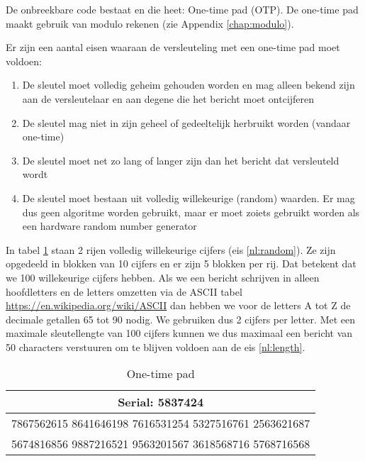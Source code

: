 De onbreekbare code bestaat en die heet: One-time pad (OTP). De one-time pad maakt gebruik van modulo rekenen (zie Appendix \ref{chap:modulo}).

Er zijn een aantal eisen waaraan de versleuteling met een one-time pad moet voldoen:
\begin{enumerate}
\item \label{nl:secret} De sleutel moet volledig geheim gehouden worden en mag alleen bekend zijn aan de versleutelaar en aan degene die het bericht moet ontcijferen
\item \label{nl:reuse} De sleutel mag niet in zijn geheel of gedeeltelijk herbruikt worden (vandaar one-time)
\item \label{nl:length} De sleutel moet net zo lang of langer zijn dan het bericht dat versleuteld wordt
\item \label{nl:random} De sleutel moet bestaan uit volledig willekeurige (random) waarden. Er mag dus geen algoritme worden gebruikt, maar er moet zoiets gebruikt worden als een hardware random number generator
\end{enumerate}

In tabel \ref{tab:onetimepad} staan 2 rijen volledig willekeurige cijfers (eis \ref{nl:random}). Ze zijn opgedeeld in blokken van 10 cijfers en er zijn 5 blokken per rij. Dat betekent dat we 100 willekeurige cijfers hebben. Als we een bericht schrijven in alleen hoofdletters en de letters omzetten via de ASCII tabel \url{https://en.wikipedia.org/wiki/ASCII} dan hebben we voor de letters A tot Z de decimale getallen 65 tot 90 nodig. We gebruiken dus 2 cijfers per letter. Met een maximale sleutellengte van 100 cijfers kunnen we dus maximaal een bericht van 50 characters verstuuren om te blijven voldoen aan de eis \ref{nl:length}.

\begin{table}[h!]
\begin{tabular}{ | c | }
\hline
	Serial: 5837424 \\
\hline
	7867562615 8641646198 7616531254 5327516761 2563621687 \\
	5674816856 9887216521 9563201567 3618568716 5768716568 \\
\hline
\end{tabular}
\caption{One-time pad}
\label{tab:onetimepad}
\end{table}

